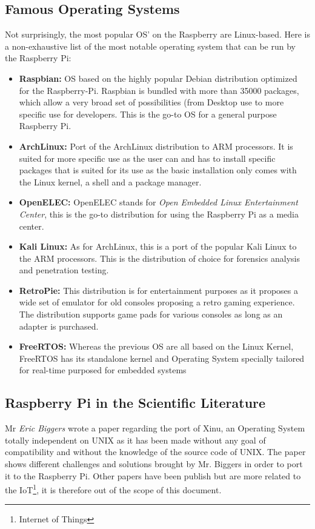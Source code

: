 \subsection{Famous Operating Systems}
Not surprisingly, the most popular OS' on the Raspberry are Linux-based. Here is a non-exhaustive list of the most notable operating system that can be run by the Raspberry Pi:
\begin{itemize}
\item\textbf{Raspbian\cite{raspbian}:} OS based on the highly popular Debian distribution optimized for the Raspberry-Pi. Raspbian is bundled with more than 35000 packages, which allow a very broad set of possibilities (from Desktop use to more specific use for developers. This is the go-to OS for a general purpose Raspberry Pi.

\item\textbf{ArchLinux\cite{archlinux_arm}:} Port of the ArchLinux distribution to ARM processors. It is suited for more specific use as the user can and has to install specific packages that is suited for its use as the basic installation only comes with the Linux kernel, a shell and a package manager.

\item\textbf{OpenELEC\cite{openelec}:} OpenELEC stands for \textit{Open Embedded Linux Entertainment Center}, this is the go-to distribution for using the Raspberry Pi as a media center.

\item\textbf{Kali Linux\cite{kali}:} As for ArchLinux, this is a port of the popular Kali Linux to the ARM processors. This is the distribution of choice for forensics analysis and penetration testing.

\item\textbf{RetroPie\cite{retropie}:}  This distribution is for entertainment purposes as it proposes a wide set of emulator for old consoles proposing a retro gaming experience. The distribution supports game pads for various consoles as long as an adapter is purchased.

\item\textbf{FreeRTOS\cite{freertos}:} Whereas the previous OS are all based on the Linux Kernel, FreeRTOS has its standalone kernel and Operating System specially tailored for real-time purposed for embedded systems
\end{itemize}


\subsection{Raspberry Pi in the Scientific Literature}

Mr \textit{Eric Biggers} wrote a paper regarding the port of Xinu\cite{xinu_biggers}, an Operating System totally independent on UNIX as it has been made without any goal of compatibility and without the knowledge of the source code of UNIX. The paper shows different challenges and solutions brought by Mr. Biggers in order to port it to the Raspberry Pi. Other papers have been publish but are more related to the IoT\footnote{Internet of Things}, it is therefore out of the scope of this document.
